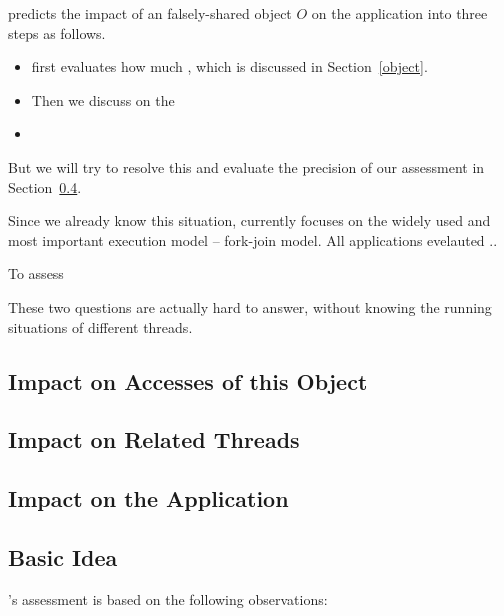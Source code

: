\cheetah{} predicts the impact of an falsely-shared object $O$ on the application into three steps as follows. 

\begin{itemize}
\item \cheetah{} first evaluates how much , which is discussed in Section~\ref{object}. 
\item Then we discuss on the 
\item
\end{itemize}



But we will try to resolve this and evaluate the precision of our assessment in Section~\ref{}. 

Since we already know this situation, \cheetah{} currently focuses on the widely used and most important execution model -- fork-join model. All applications evelauted .. 


To assess 

These two questions are actually hard to answer, without knowing the running situations of different threads. 





\subsection{Impact on Accesses of this Object}

\subsection{Impact on Related Threads}

\subsection{Impact on the Application}

\subsection{Basic Idea}

\cheetah{}'s assessment is based on the following observations:

